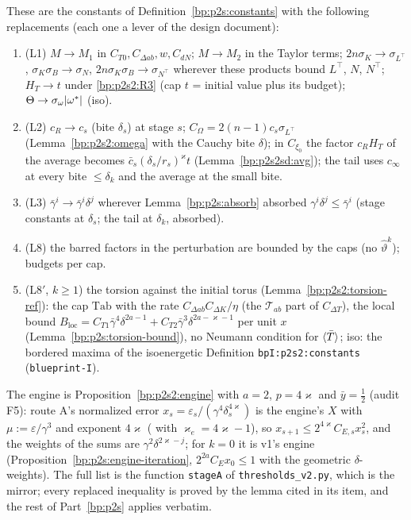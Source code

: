 \begin{definition}\label{bp:p2s2:constantsA}
These are the constants of Definition~\ref{bp:p2s:constants} with the following replacements (each one a lever of the design document):
\begin{enumerate}[label=(A\arabic*)]
\item (L1) $M\to M_1$ in $C_{T0},C_{\Delta ab},w,C_{dN}$; $M\to M_2$ in the Taylor terms; $2n\sigma_K\to\sigma_{L^\top}$, $\sigma_K\sigma_B\to\sigma_N$, $2n\sigma_K\sigma_B\to\sigma_{N^\top}$
  wherever these products bound $L^\top$, $N$, $N^\top$; $H_T\to t$ under \ref{bp:p2s2:R3} (cap $t$ = initial value plus its budget); $\Theta\to\sigma_\omega\lvert \omega^*\rvert$ (iso).
\item (L2) $c_R\to c_s$ (bite $\delta_s$) at stage $s$; $C_\Omega=2(n-1)c_s\sigma_{L^\top}$ (Lemma~\ref{bp:p2s2:omega} with the Cauchy bite $\delta$); in $C_{\xi_0}$ the factor $c_RH_T$ of the
  average becomes $\bar c_s(\delta_s/r_s)^\varkappa t$ (Lemma~\ref{bp:p2s2sd:avg}); the tail uses $c_\infty$ at every bite $\le\delta_k$ and the average at the small bite.
\item (L3) $\bar\gamma^i\to\bar\gamma^i\delta^j$ wherever Lemma~\ref{bp:p2s:absorb} absorbed $\gamma^i\delta^j\le\bar\gamma^i$ (stage constants at $\delta_s$; the tail at $\delta_k$, absorbed).
\item (L8) the barred factors in the perturbation are bounded by the caps (no $\hat\vartheta^k$); budgets per cap.
\item (L8$'$, $k\ge1$) the torsion against the initial torus (Lemma~\ref{bp:p2s2:torsion-ref}): the cap $\mathrm{Tab}$ with the rate $C_{\Delta ab}C_{\Delta K}/\eta$ (the
  $\mathcal T_{ab}$ part of $C_{\Delta T}$), the local bound $B_{\mathrm{loc}}=C_{T1}\bar\gamma^4\delta^{2a-1}+C_{T2}\bar\gamma^3\delta^{2a-\varkappa-1}$ per unit $x$ (Lemma~\ref{bp:p2s:torsion-bound}),
  no Neumann condition for $\langle \bar T\rangle$; iso: the bordered maxima of the isoenergetic Definition \texttt{bpI:p2s2:constants} (\texttt{blueprint-I}).
\end{enumerate}
The engine is Proposition~\ref{bp:p2s2:engine} with $a=2$, $p=4\varkappa$ and $\bar y=\frac12$ (audit F5): route A's normalized error
$x_s=\varepsilon_s/(\gamma^4\delta_s^{4\varkappa})$ is the engine's $X$ with $\mu:=\varepsilon/\gamma^3$ and exponent $4\varkappa$ ( with $\varkappa_e=4\varkappa-1$), so
$x_{s+1}\le2^{4\varkappa}C_{E,s}x_s^2$, and the weights of the sums are $\gamma^2\delta^{2\varkappa-j}$; for $k=0$ it is v1's engine
(Proposition~\ref{bp:p2s:engine-iteration}, $2^{2a}C_Ex_0\le1$ with the geometric $\delta$-weights). The full list is the function \texttt{stageA} of
\texttt{thresholds\_v2.py}, which is the mirror; every replaced inequality is proved by the lemma cited in its item, and the rest of
Part~\ref{bp:p2s} applies verbatim.
\end{definition}

